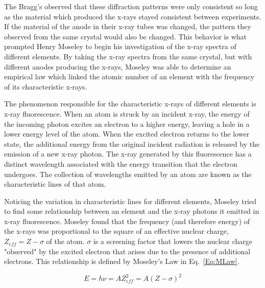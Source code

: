 \documentclass[%
 reprint,
 amsmath,amssymb,
 aps,
 pra,
]{revtex4-1}
\begin{document}
The Bragg's observed that these diffraction patterns were only consistent so long as the material which produced the x-rays stayed consistent between experiments. If the material of the anode in their x-ray tubes was changed, the pattern they observed from the same crystal would also be changed. This behavior is what prompted Henry Moseley to begin his investigation of the x-ray spectra of different elements. By taking the x-ray spectra from the same crystal, but with different anodes producing the x-rays, Moseley was able to determine an empirical law which linked the atomic number of an element with the frequency of its characteristic x-rays.

The phenomenon responsible for the characteristic x-rays of different elements is x-ray fluorescence. When an atom is struck by an incident x-ray, the energy of the incoming photon excites an electron to a higher energy, leaving a hole in a lower energy level of the atom. When the excited electron returns to the lower state, the additional energy from the original incident radiation is released by the emission of a new x-ray photon. The x-ray generated by this fluorescence has a distinct wavelength associated with the energy transition that the electron undergoes. The collection of wavelengths emitted by an atom are known as the characteristic lines of that atom.

Noticing the variation in characteristic lines for different elements, Moseley tried to find some relationship between an element and the x-ray photons it emitted in x-ray fluorescence. Moseley found that the frequency (and therefore energy) of the x-rays was proportional to the square of an effective nuclear charge, $Z_{eff} = Z - \sigma$ of the atom. $\sigma$ is a screening factor that lowers the nuclear charge "observed" by the excited electron that arises due to the presence of additional electrons. \cite{moseley} This relationship is defined by Moseley's Law in Eq.~\ref{Eq:MLaw}. 

\begin{equation}\label{Eq:MLaw}
E = h\nu = A Z_{eff}^{2} = A (Z - \sigma)^2
\end{equation}
\end{document}

